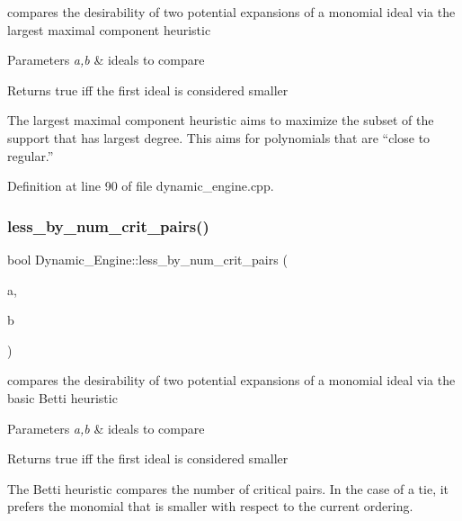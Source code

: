 compares the desirability of two potential expansions of a monomial ideal via the largest maximal component heuristic 


\begin{DoxyParams}{Parameters}
{\em a,b} & ideals to compare \\
\hline
\end{DoxyParams}
\begin{DoxyReturn}{Returns}
{\ttfamily true} iff the first ideal is considered smaller
\end{DoxyReturn}
The largest maximal component heuristic aims to maximize the subset of the support that has largest degree. This aims for polynomials that are ``close to regular.'' 

Definition at line 90 of file dynamic\+\_\+engine.\+cpp.

\mbox{\label{namespace_dynamic___engine_ab4b77c648c1c2892cffba4dcf2a6d80a}} 
\subsubsection{\texorpdfstring{less\+\_\+by\+\_\+num\+\_\+crit\+\_\+pairs()}{less\_by\_num\_crit\_pairs()}}
{\footnotesize\ttfamily bool Dynamic\+\_\+\+Engine\+::less\+\_\+by\+\_\+num\+\_\+crit\+\_\+pairs (\begin{DoxyParamCaption}\item[{\hyperlink{group___g_b_computation_class_dynamic___engine_1_1_p_p___with___ideal}{P\+P\+\_\+\+With\+\_\+\+Ideal} \&}]{a,  }\item[{\hyperlink{group___g_b_computation_class_dynamic___engine_1_1_p_p___with___ideal}{P\+P\+\_\+\+With\+\_\+\+Ideal} \&}]{b }\end{DoxyParamCaption})}



compares the desirability of two potential expansions of a monomial ideal via the basic Betti heuristic 


\begin{DoxyParams}{Parameters}
{\em a,b} & ideals to compare \\
\hline
\end{DoxyParams}
\begin{DoxyReturn}{Returns}
{\ttfamily true} iff the first ideal is considered smaller
\end{DoxyReturn}
The Betti heuristic compares the number of critical pairs. In the case of a tie, it prefers the monomial that is smaller with respect to the current ordering. 

